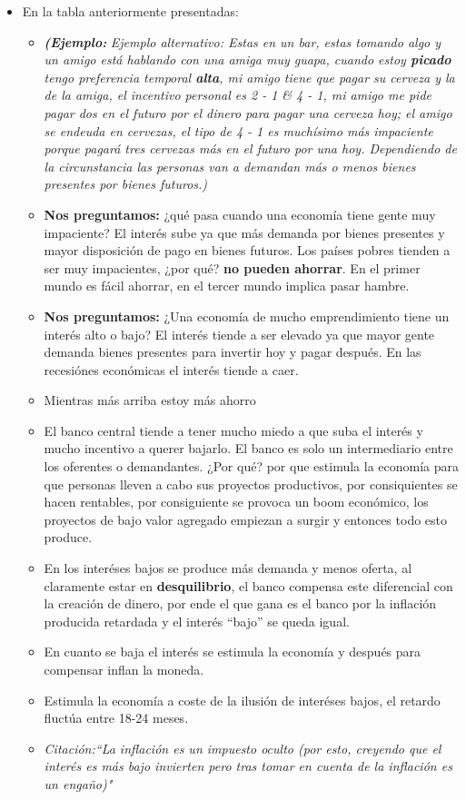 \begin{itemize}
    \item En la tabla anteriormente presentadas:
    \begin{itemize}
        \item \textbf{\emph{(Ejemplo:}}\emph{ Ejemplo alternativo: Estas en un bar, estas tomando algo y un amigo está hablando con una amiga muy guapa, cuando estoy \textbf{picado} tengo preferencia temporal \textbf{alta}, mi amigo tiene que pagar su cerveza y la de la amiga, el incentivo personal es 2 - 1 \& 4 - 1, mi amigo me pide pagar dos en el futuro por el dinero para pagar una cerveza hoy; el amigo se endeuda en cervezas, el tipo de 4 - 1 es muchísimo más impaciente porque pagará  tres cervezas más en el futuro por una hoy. Dependiendo de la circunstancia las personas van a demandan más o menos bienes presentes por bienes futuros.)}
        \item \textbf{Nos preguntamos:} ¿qué pasa cuando una economía tiene gente muy impaciente? El interés sube ya que más demanda por bienes presentes y mayor disposición de pago en bienes futuros. Los países pobres tienden a ser muy impacientes, ¿por qué? \textbf{no pueden ahorrar}. En el primer mundo es fácil ahorrar, en el tercer mundo implica pasar hambre.
        
        \item \textbf{Nos preguntamos:} ¿Una economía de mucho emprendimiento tiene un interés alto o bajo? El interés tiende a ser elevado ya que mayor gente demanda bienes presentes para invertir hoy y pagar después. En las recesiónes económicas el interés tiende a caer.

        
        \item Mientras más arriba estoy más ahorro
        \item El banco central tiende a tener mucho miedo a que suba el interés y mucho incentivo a querer bajarlo. El banco es solo un intermediario entre los oferentes o demandantes. ¿Por qué? por que estimula la economía para que personas lleven a cabo sus proyectos productivos, por consiquientes se hacen rentables, por consiguiente se provoca un boom económico, los proyectos de bajo valor agregado empiezan a surgir y entonces todo esto produce.
        \item En los interéses bajos se produce más demanda y menos oferta, al claramente estar en \textbf{desquilibrio}, el banco compensa este diferencial con la creación de dinero, por ende el que gana es el banco por la inflación producida retardada y el interés ``bajo'' se queda igual. 
        \item En cuanto se baja el interés se estimula la economía y después para compensar inflan la moneda.
        \item Estimula la economía a coste de la ilusión de interéses bajos, el retardo fluctúa entre 18-24 meses.
        \item \emph{Citación:``La inflación es un impuesto oculto (por esto, creyendo que el interés es más bajo invierten pero tras tomar en cuenta de la inflación es un engaño)"} 
    \end{itemize}
\end{itemize}
